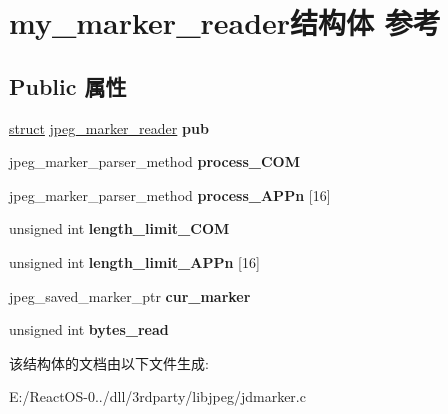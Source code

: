 \hypertarget{structmy__marker__reader}{}\section{my\+\_\+marker\+\_\+reader结构体 参考}
\label{structmy__marker__reader}
\subsection*{Public 属性}
\begin{DoxyCompactItemize}
\item 
\mbox{\label{structmy__marker__reader_ac0d8a24c85575d304ef4383e8f6ca5fc}} 
\hyperlink{interfacestruct}{struct} \hyperlink{structjpeg__marker__reader}{jpeg\+\_\+marker\+\_\+reader} {\bfseries pub}
\item 
\mbox{\label{structmy__marker__reader_a5e10e69e117d23840f04d54e7a3cdde5}} 
jpeg\+\_\+marker\+\_\+parser\+\_\+method {\bfseries process\+\_\+\+C\+OM}
\item 
\mbox{\label{structmy__marker__reader_a3a466da71db30199ab019a03960013cc}} 
jpeg\+\_\+marker\+\_\+parser\+\_\+method {\bfseries process\+\_\+\+A\+P\+Pn} \mbox{[}16\mbox{]}
\item 
\mbox{\label{structmy__marker__reader_aa17938db027aceb539d880b78841826e}} 
unsigned int {\bfseries length\+\_\+limit\+\_\+\+C\+OM}
\item 
\mbox{\label{structmy__marker__reader_a029e9f21bc02a21c1a26d3c0d7158098}} 
unsigned int {\bfseries length\+\_\+limit\+\_\+\+A\+P\+Pn} \mbox{[}16\mbox{]}
\item 
\mbox{\label{structmy__marker__reader_a861ef3029e1690b4345a8ceb3975e8df}} 
jpeg\+\_\+saved\+\_\+marker\+\_\+ptr {\bfseries cur\+\_\+marker}
\item 
\mbox{\label{structmy__marker__reader_ada1054ee3408bbfcacdddb27af8d9754}} 
unsigned int {\bfseries bytes\+\_\+read}
\end{DoxyCompactItemize}


该结构体的文档由以下文件生成\+:\begin{DoxyCompactItemize}
\item 
E\+:/\+React\+O\+S-\/0../dll/3rdparty/libjpeg/jdmarker.\+c\end{DoxyCompactItemize}
